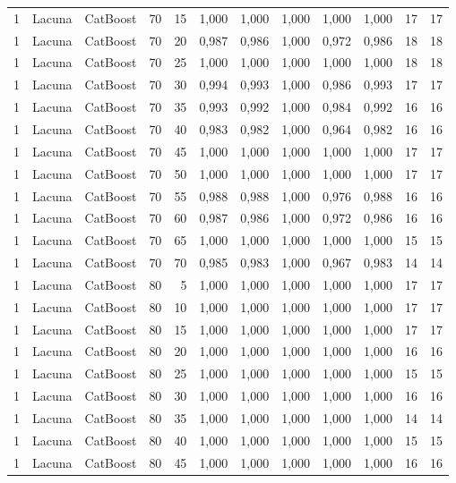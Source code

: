 \begin{longtable}{@{}rllrrrrrrrrr@{}}
1 & Lacuna & CatBoost & 70 & 15 & 1,000 & 1,000 & 1,000 & 1,000 & 1,000 & 17 & 17 \\
1 & Lacuna & CatBoost & 70 & 20 & 0,987 & 0,986 & 1,000 & 0,972 & 0,986 & 18 & 18 \\
1 & Lacuna & CatBoost & 70 & 25 & 1,000 & 1,000 & 1,000 & 1,000 & 1,000 & 18 & 18 \\
1 & Lacuna & CatBoost & 70 & 30 & 0,994 & 0,993 & 1,000 & 0,986 & 0,993 & 17 & 17 \\
1 & Lacuna & CatBoost & 70 & 35 & 0,993 & 0,992 & 1,000 & 0,984 & 0,992 & 16 & 16 \\
1 & Lacuna & CatBoost & 70 & 40 & 0,983 & 0,982 & 1,000 & 0,964 & 0,982 & 16 & 16 \\
1 & Lacuna & CatBoost & 70 & 45 & 1,000 & 1,000 & 1,000 & 1,000 & 1,000 & 17 & 17 \\
1 & Lacuna & CatBoost & 70 & 50 & 1,000 & 1,000 & 1,000 & 1,000 & 1,000 & 17 & 17 \\
1 & Lacuna & CatBoost & 70 & 55 & 0,988 & 0,988 & 1,000 & 0,976 & 0,988 & 16 & 16 \\
1 & Lacuna & CatBoost & 70 & 60 & 0,987 & 0,986 & 1,000 & 0,972 & 0,986 & 16 & 16 \\
1 & Lacuna & CatBoost & 70 & 65 & 1,000 & 1,000 & 1,000 & 1,000 & 1,000 & 15 & 15 \\
1 & Lacuna & CatBoost & 70 & 70 & 0,985 & 0,983 & 1,000 & 0,967 & 0,983 & 14 & 14 \\
1 & Lacuna & CatBoost & 80 & 5 & 1,000 & 1,000 & 1,000 & 1,000 & 1,000 & 17 & 17 \\
1 & Lacuna & CatBoost & 80 & 10 & 1,000 & 1,000 & 1,000 & 1,000 & 1,000 & 17 & 17 \\
1 & Lacuna & CatBoost & 80 & 15 & 1,000 & 1,000 & 1,000 & 1,000 & 1,000 & 17 & 17 \\
1 & Lacuna & CatBoost & 80 & 20 & 1,000 & 1,000 & 1,000 & 1,000 & 1,000 & 16 & 16 \\
1 & Lacuna & CatBoost & 80 & 25 & 1,000 & 1,000 & 1,000 & 1,000 & 1,000 & 15 & 15 \\
1 & Lacuna & CatBoost & 80 & 30 & 1,000 & 1,000 & 1,000 & 1,000 & 1,000 & 16 & 16 \\
1 & Lacuna & CatBoost & 80 & 35 & 1,000 & 1,000 & 1,000 & 1,000 & 1,000 & 14 & 14 \\
1 & Lacuna & CatBoost & 80 & 40 & 1,000 & 1,000 & 1,000 & 1,000 & 1,000 & 15 & 15 \\
1 & Lacuna & CatBoost & 80 & 45 & 1,000 & 1,000 & 1,000 & 1,000 & 1,000 & 16 & 16 \\

\end{longtable}
